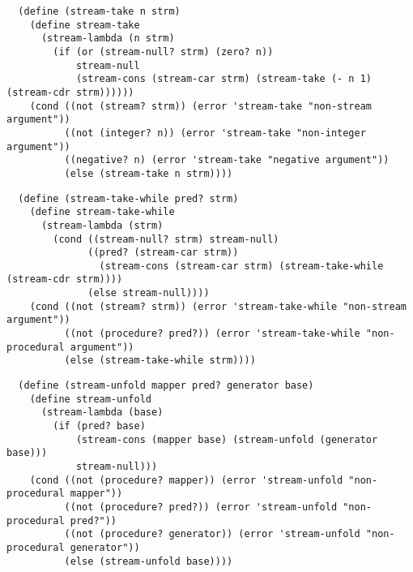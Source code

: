 \begin{verbatim}
  (define (stream-take n strm)
    (define stream-take
      (stream-lambda (n strm)
        (if (or (stream-null? strm) (zero? n))
            stream-null
            (stream-cons (stream-car strm) (stream-take (- n 1) (stream-cdr strm))))))
    (cond ((not (stream? strm)) (error 'stream-take "non-stream argument"))
          ((not (integer? n)) (error 'stream-take "non-integer argument"))
          ((negative? n) (error 'stream-take "negative argument"))
          (else (stream-take n strm))))
\end{verbatim}

\begin{verbatim}
  (define (stream-take-while pred? strm)
    (define stream-take-while
      (stream-lambda (strm)
        (cond ((stream-null? strm) stream-null)
              ((pred? (stream-car strm))
                (stream-cons (stream-car strm) (stream-take-while (stream-cdr strm))))
              (else stream-null))))
    (cond ((not (stream? strm)) (error 'stream-take-while "non-stream argument"))
          ((not (procedure? pred?)) (error 'stream-take-while "non-procedural argument"))
          (else (stream-take-while strm))))
\end{verbatim}

\begin{verbatim}
  (define (stream-unfold mapper pred? generator base)
    (define stream-unfold
      (stream-lambda (base)
        (if (pred? base)
            (stream-cons (mapper base) (stream-unfold (generator base)))
            stream-null)))
    (cond ((not (procedure? mapper)) (error 'stream-unfold "non-procedural mapper"))
          ((not (procedure? pred?)) (error 'stream-unfold "non-procedural pred?"))
          ((not (procedure? generator)) (error 'stream-unfold "non-procedural generator"))
          (else (stream-unfold base))))
\end{verbatim}

